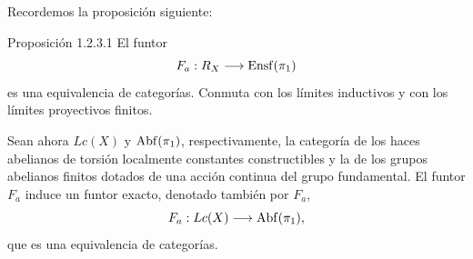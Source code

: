 Recordemos la proposición siguiente:

\begin{statement}{Proposición 1.2.3.1}
El funtor
\[
F_a:R_X\longrightarrow \operatorname{Ensf}(\pi_1)
\]
es una equivalencia de categorías. Conmuta con los límites inductivos y con los límites proyectivos finitos.
\end{statement}

Sean ahora \(Lc(X)\) y \(\operatorname{Abf}(\pi_1)\), respectivamente, la categoría de los haces abelianos de torsión localmente constantes constructibles y la de los grupos abelianos finitos dotados de una acción continua del grupo fundamental. El funtor \(F_a\) induce un funtor exacto, denotado también por \(F_a\),
\[
F_a:Lc(X)\longrightarrow \operatorname{Abf}(\pi_1),
\]
que es una equivalencia de categorías.
